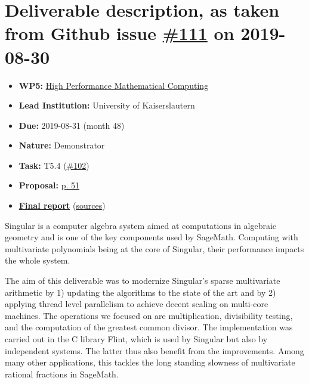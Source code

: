 \hypertarget{deliverable-description-as-taken-from-github-issue-111-on-2019-08-30}{%
\section*{\texorpdfstring{Deliverable description, as taken from Github
issue
\href{https://github.com/OpenDreamKit/OpenDreamKit/issues/111}{\#111} on
2019-08-30}{Deliverable description, as taken from Github issue \#111 on 2019-08-30}}\label{deliverable-description-as-taken-from-github-issue-111-on-2019-08-30}}

\begin{itemize}
\tightlist
\item
  \textbf{WP5:}
  \href{https://github.com/OpenDreamKit/OpenDreamKit/tree/master/WP5}{High
  Performance Mathematical Computing}
\item
  \textbf{Lead Institution:} University of Kaiserslautern
\item
  \textbf{Due:} 2019-08-31 (month 48)
\item
  \textbf{Nature:} Demonstrator
\item
  \textbf{Task:} T5.4
  (\href{https://github.com/OpenDreamKit/OpenDreamKit/issues/102}{\#102})
\item
  \textbf{Proposal:}
  \href{https://github.com/OpenDreamKit/OpenDreamKit/raw/master/Proposal/proposal-www.pdf}{p.
  51}
\item
  \textbf{\href{https://github.com/OpenDreamKit/OpenDreamKit/raw/master/WP5/D5.13/report-final.pdf}{Final
  report}}
  (\href{https://github.com/OpenDreamKit/OpenDreamKit/raw/master/WP5/D5.13/}{sources})
\end{itemize}

Singular is a computer algebra system aimed at computations in algebraic
geometry and is one of the key components used by SageMath. Computing
with multivariate polynomials being at the core of Singular, their
performance impacts the whole system.

The aim of this deliverable was to modernize Singular's sparse
multivariate arithmetic by 1) updating the algorithms to the state of
the art and by 2) applying thread level parallelism to achieve decent
scaling on multi-core machines. The operations we focused on are
multiplication, divisibility testing, and the computation of the
greatest common divisor. The implementation was carried out in the C
library Flint, which is used by Singular but also by independent
systems. The latter thus also benefit from the improvements. Among many
other applications, this tackles the long standing slowness of
multivariate rational fractions in SageMath.
